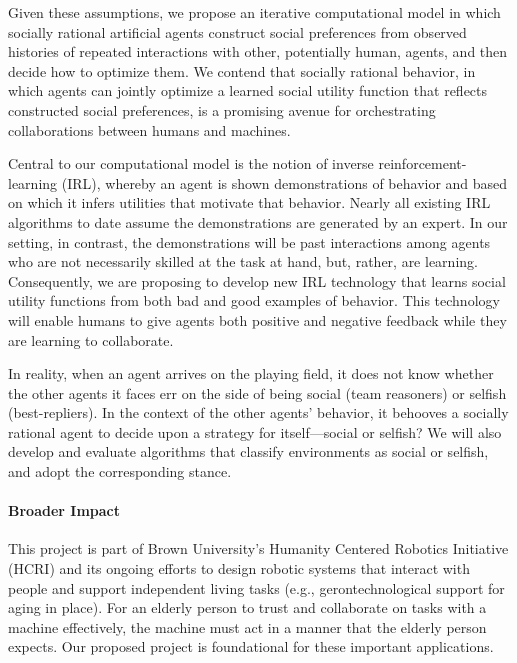 Given these assumptions, we propose an iterative computational model
in which socially rational artificial agents construct social
preferences from observed histories of repeated interactions with
other, potentially human, agents, and then decide how to optimize
them.  We contend that socially rational behavior, in which agents can
jointly optimize a learned social utility function that reflects
constructed social preferences, is a promising avenue for
orchestrating collaborations between humans and machines.

Central to our computational model is the notion of inverse
reinforcement-learning (IRL), whereby an agent is shown demonstrations
of behavior and based on which it infers utilities that motivate that
behavior.  Nearly all existing IRL algorithms to date assume the
demonstrations are generated by an expert.  In our setting, in
contrast, the demonstrations will be past interactions among agents
who are not necessarily skilled at the task at hand, but, rather, are learning.
Consequently, we are proposing to develop
new IRL technology that learns social utility functions from
both bad and good examples of behavior.  This technology will enable
humans to give agents both positive and negative feedback while they
are learning to collaborate.

In reality, when an agent arrives on the playing field, it does not
know whether the other agents it faces err on the side of being social
(team reasoners) or selfish (best-repliers).  In the context of the other agents' behavior,
it behooves a socially rational agent to decide upon a strategy
for itself---social or selfish?
%
We will also develop and evaluate algorithms that classify
environments as social or selfish, and adopt the corresponding stance.



\vspace{\up}
\paragraph{Broader Impact}
%
This project is part of Brown University's Humanity Centered
Robotics Initiative (HCRI) and its ongoing efforts to design robotic
systems that interact with people and support independent living tasks
(e.g., gerontechnological support for aging in place).  For an elderly
person to trust and collaborate on tasks with a machine effectively,
the machine must act in a manner that the elderly person expects.  Our
proposed project is foundational for these
important applications.

